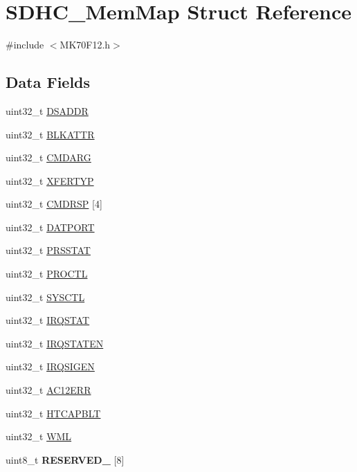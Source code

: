 \hypertarget{struct_s_d_h_c___mem_map}{}\section{S\+D\+H\+C\+\_\+\+Mem\+Map Struct Reference}
\label{struct_s_d_h_c___mem_map}


{\ttfamily \#include $<$M\+K70\+F12.\+h$>$}

\subsection*{Data Fields}
\begin{DoxyCompactItemize}
\item 
uint32\+\_\+t \hyperlink{struct_s_d_h_c___mem_map_ab31a362061944d6279ddb9477319dadf}{D\+S\+A\+D\+D\+R}
\item 
uint32\+\_\+t \hyperlink{struct_s_d_h_c___mem_map_a0a3c9777e2dc6450d432235b772eddda}{B\+L\+K\+A\+T\+T\+R}
\item 
uint32\+\_\+t \hyperlink{struct_s_d_h_c___mem_map_a74b8ea7db5c12a06f19e8054bba5c2b3}{C\+M\+D\+A\+R\+G}
\item 
uint32\+\_\+t \hyperlink{struct_s_d_h_c___mem_map_ad6c008e044af83f7411e51258f111c48}{X\+F\+E\+R\+T\+Y\+P}
\item 
uint32\+\_\+t \hyperlink{struct_s_d_h_c___mem_map_ad68e1706e76585042d163c6798c0f545}{C\+M\+D\+R\+S\+P} \mbox{[}4\mbox{]}
\item 
uint32\+\_\+t \hyperlink{struct_s_d_h_c___mem_map_a35328e0ac868a1173f45025dfe9d064a}{D\+A\+T\+P\+O\+R\+T}
\item 
uint32\+\_\+t \hyperlink{struct_s_d_h_c___mem_map_ad0cb5c4547908b9fc980737545a49824}{P\+R\+S\+S\+T\+A\+T}
\item 
uint32\+\_\+t \hyperlink{struct_s_d_h_c___mem_map_a432bb135855124848d9d885a4f31d88f}{P\+R\+O\+C\+T\+L}
\item 
uint32\+\_\+t \hyperlink{struct_s_d_h_c___mem_map_ae3204e728de4488f0b3569d1ebac78ae}{S\+Y\+S\+C\+T\+L}
\item 
uint32\+\_\+t \hyperlink{struct_s_d_h_c___mem_map_accf3cc2723054bbe32bb641e670d19e3}{I\+R\+Q\+S\+T\+A\+T}
\item 
uint32\+\_\+t \hyperlink{struct_s_d_h_c___mem_map_a6bc70391d95768a1b757bf17731f5f97}{I\+R\+Q\+S\+T\+A\+T\+E\+N}
\item 
uint32\+\_\+t \hyperlink{struct_s_d_h_c___mem_map_a21516e4f38134a06a1f1dc718676e72e}{I\+R\+Q\+S\+I\+G\+E\+N}
\item 
uint32\+\_\+t \hyperlink{struct_s_d_h_c___mem_map_a3d4ff140cfa30e28f82a66490103dc18}{A\+C12\+E\+R\+R}
\item 
uint32\+\_\+t \hyperlink{struct_s_d_h_c___mem_map_ae8e1450bf44904b339a9d799f54f2847}{H\+T\+C\+A\+P\+B\+L\+T}
\item 
uint32\+\_\+t \hyperlink{struct_s_d_h_c___mem_map_a8c1eb45065f5eb8878fc02701f2a6750}{W\+M\+L}
\item 
\hypertarget{struct_s_d_h_c___mem_map_af17041992034c8eda4f28d071b897d87}{}uint8\+\_\+t {\bfseries R\+E\+S\+E\+R\+V\+E\+D\+\_} \mbox{[}8\mbox{]}\label{struct_s_d_h_c___mem_map_af17041992034c8eda4f28d071b897d87}


\end{DoxyCompactItemize}
